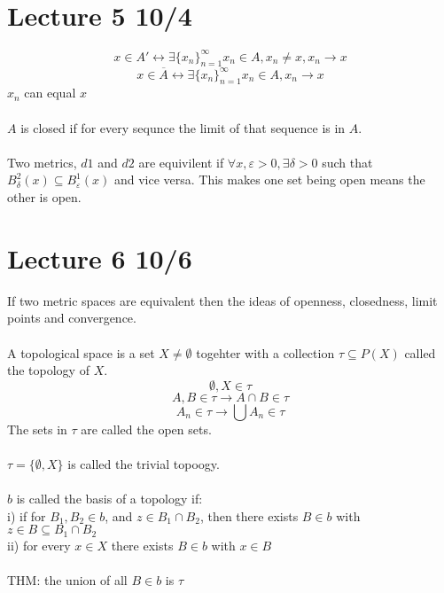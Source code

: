 \documentclass[12pt]{article}
\begin{document}
\newpage
\section{Lecture 5 10/4}
$$x \in A' \longleftrightarrow \exists \{x_n\}_{n=1}^\infty x_n \in A, x_n \neq x, x_n \longrightarrow x$$
$$x \in \overline{A} \longleftrightarrow \exists \{x_n\}_{n=1}^\infty x_n \in A, x_n \longrightarrow x$$
$x_n$ can equal $x$\\\\ 
$A$ is closed if for every sequnce the limit of that sequence is in $A$.\\\\
Two metrics, $d1$ and $d2$ are equivilent if $\forall x, \varepsilon > 0, \exists \delta > 0$ such that $B^2_\delta(x) \subseteq B^1_\varepsilon(x)$ and vice versa. This makes one set being open means the other is open.  

\newpage
\section{Lecture 6 10/6}
If two metric spaces are equivalent then the ideas of openness, closedness, limit points and convergence. \\\\
A topological space is a set $X \neq \emptyset$ togehter with a collection $\tau \subseteq P(X)$ called the topology of $X$. $$\emptyset, X \in \tau$$
$$A,B \in \tau \longrightarrow A \cap B \in \tau$$
$$A_n \in \tau \longrightarrow \bigcup A_n \in \tau$$
The sets in $\tau$ are called the open sets.\\\\
$\tau = \{\emptyset, X\}$ is called the trivial topoogy. \\\\
$b$ is called the basis of a topology if: \\
i) if for $B_1, B_2 \in b$, and $z \in B_1 \cap B_2$, then there exists $B \in b$ with $z \in B \subseteq B_1 \cap B_2$\\
ii) for every $x \in X$ there exists $B \in b$ with $x \in B$\\\\
THM: the union of all $B \in b$ is $\tau$
\end{document}
